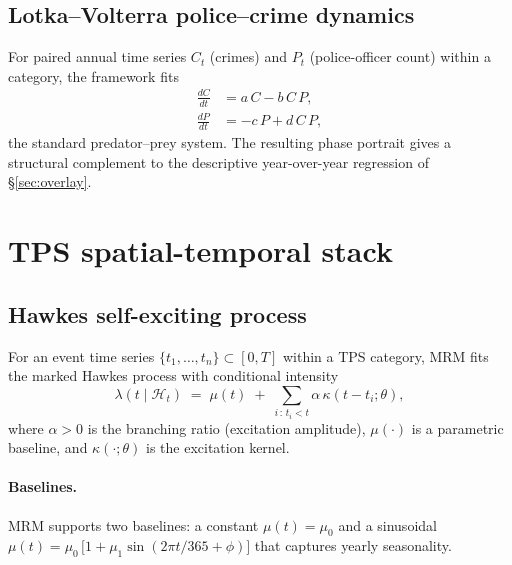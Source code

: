 \documentclass[11pt,a4paper]{article}
\theoremstyle{plain}
\theoremstyle{definition}
\theoremstyle{remark}
\begin{document}
\subsection{Lotka--Volterra police--crime dynamics}

For paired annual time series $C_{t}$ (crimes) and $P_{t}$
(police-officer count) within a category, the framework fits
\begin{align}
  \frac{dC}{dt} &= a\,C - b\,C\,P, \\
  \frac{dP}{dt} &= -c\,P + d\,C\,P,
  \label{eq:lotka-volterra}
\end{align}
the standard predator--prey system. The resulting phase portrait
gives a structural complement to the descriptive year-over-year
regression of \S\ref{sec:overlay}.

\section{TPS spatial-temporal stack}
\label{sec:tps-spatial}

\subsection{Hawkes self-exciting process}

For an event time series $\{t_{1}, \ldots, t_{n}\} \subset [0, T]$
within a TPS category, MRM fits the marked Hawkes process with
conditional intensity
\begin{equation}
  \lambda(t \mid \mathcal{H}_{t})
  \;=\; \mu(t) \;+\;
  \sum_{i \,:\, t_{i} < t} \alpha\, \kappa(t - t_{i}; \theta),
  \label{eq:hawkes}
\end{equation}
where $\alpha > 0$ is the branching ratio (excitation amplitude),
$\mu(\cdot)$ is a parametric baseline, and
$\kappa(\cdot; \theta)$ is the excitation kernel.

\paragraph{Baselines.} MRM supports two baselines: a constant
$\mu(t) = \mu_{0}$ and a sinusoidal
$\mu(t) = \mu_{0}\,\bigl[1 + \mu_{1}\sin(2\pi t/365 + \phi)\bigr]$
that captures yearly seasonality.
\end{document}
